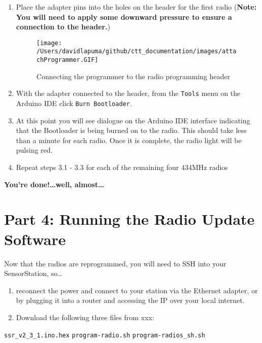 \documentclass[
]{article}
\begin{document}
\begin{enumerate}
\def\labelenumi{\arabic{enumi}.}
\item
  Place the adapter pins into the holes on the header for the first
  radio (\textbf{Note: You will need to apply some downward pressure to
  ensure a connection to the header.})

  \begin{figure}
  \hypertarget{id}{%
  \centering
  \texttt{[image: /Users/davidlapuma/github/ctt\_documentation/images/attachProgrammer.GIF]}
  \caption{Connecting the programmer to the radio programming
  header}\label{id}
  }
  \end{figure}
\item
  With the adapter connected to the header, from the \texttt{Tools} menu
  on the Arduino IDE click \texttt{Burn\ Bootloader}.
\item
  At this point you will see dialogue on the Arduino IDE interface
  indicating that the Bootloader is being burned on to the radio. This
  should take less than a minute for each radio. Once it is complete,
  the radio light will be pulsing red.
\item
  Repeat steps 3.1 - 3.3 for each of the remaining four 434MHz radios
\end{enumerate}

\textbf{You're done!\ldots well, almost\ldots{}}

\hypertarget{part-4-running-the-radio-update-software}{%
\section{Part 4: Running the Radio Update
Software}\label{part-4-running-the-radio-update-software}}

Now that the radios are reprogrammed, you will need to SSH into your
SensorStation, so\ldots{}

\begin{enumerate}
\def\labelenumi{\arabic{enumi}.}
\item
  reconnect the power and connect to your station via the Ethernet
  adapter, or by plugging it into a router and accessing the IP over
  your local internet.
\item
  Download the following three files from xxx:
\end{enumerate}

\texttt{ssr\_v2\_3\_1.ino.hex} \texttt{program-radio.sh}
\texttt{program-radios\_sh.sh}
\end{document}

